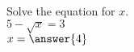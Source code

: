 \documentclass{ximera}
\author{David Kish}
\begin{document}
\begin{exercise}
Solve the equation for $x$.\\
$5-\sqrt{x} = 3$\\
$x=\answer{4}$
\end{exercise}
\end{document}
